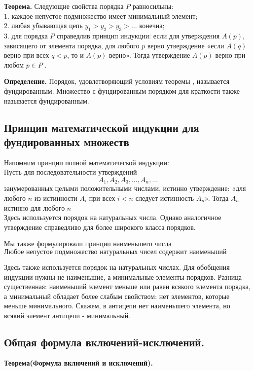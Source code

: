 \documentclass[a4paper, 10pt]{article}
\begin{document}
\textbf{Теорема.} Следующие свойства порядка $P$ равносильны: \\
1. каждое непустое подмножество имеет минимальный элемент; \\
2. любая убывающая цепь $y_1 > y_2 > y_3 > \dots$ конечна; \\
3. для порядка $P$ справедлив принцип индукции: если для утверждения $A(p)$, зависящего от элемента порядка, для любого $p$ верно утверждение «если $A(q)$ верно при всех $q < p$, то и $A(p)$ верно». Тогда утверждение $A(p)$ верно при любом $p \in P$ .

\textbf{Определение.} Порядок, удовлетворяющий условиям теоремы , называется фундированным. Множество с фундированным порядком для краткости также называется фундированным.

\subsection{Принцип математической индукции для фундированных множеств}

Напомним принцип полной математической индукции: \\

Пусть для последовательности утверждений $$A_1, A_2, A_3, \dots , A_n, \dots$$ занумерованных целыми положительными числами, истинно утверждение: «для любого $n$ из истинности $A_i$ при всех $i < n$ следует истинность $A_n$». Тогда $A_n$ истинно для любого $n$ \\

Здесь используется порядок на натуральных числа. Однако аналогичное утверждение справедливо для более широкого класса порядков.

Мы также формулировали принцип наименьшего числа $$\text{
Любое непустое подмножество натуральных чисел содержит наименьший элемент.}$$

Здесь также используется порядок на натуральных числах. Для обобщения индукции нужны не наименьшие, а минимальные элементы порядков. Разница существенная: наименьший элемент меньше или равен всякого элемента порядка, а минимальный обладает более слабым свойством: нет элементов, которые меньше минимального. Скажем, в антицепи нет наименьшего элемента, но всякий элемент антицепи - минимальный.

\subsection{Общая формула включений-исключений.}

\textbf{Теорема(Формула включений и исключений).} %
\end{document}
